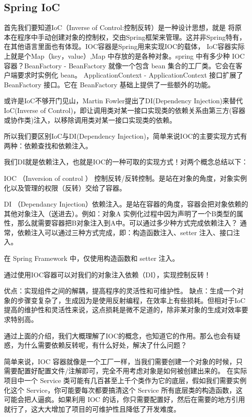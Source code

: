 \documentclass[../../../interview-questions.tex]{subfiles}
\begin{document}
\subsection{Spring IoC}

首先我们要知道IoC（Inverse of Control:控制反转）是一种设计思想，就是 将原本在程序中手动创建对象的控制权，交由Spring框架来管理。这并非Spring特有，在其他语言里面也有体现。IOC容器是Spring用来实现IOC的载体， IoC容器实际上就是个Map（key，value）,Map 中存放的是各种对象。spring 中有多少种 IOC 容器？BeanFactory - BeanFactory 就像一个包含 bean 集合的工厂类。它会在客户端要求时实例化 bean。
ApplicationContext - ApplicationContext 接口扩展了 BeanFactory 接口。它在 BeanFactory 基础上提供了一些额外的功能。

或许是IoC不够开门见山，Martin Fowler提出了DI(Dependency Injection)来替代IoC(Inverse of Control)，即让调用类对某一接口实现类的依赖关系由第三方(容器或协作类)注入，以移除调用类对某一接口实现类的依赖。

所以我们要区别IoC与DI(Dependency Injection)，简单来说IOC的主要实现方式有两种：依赖查找和依赖注入。

我们DI就是依赖注入，也就是IOC的一种可取的实现方式！对两个概念总结以下：

IOC （Inversion of control ） 控制反转/反转控制。是站在对象的角度，对象实例化以及管理的权限（反转）交给了容器。

DI （Dependancy Injection）依赖注入。是站在容器的角度，容器会把对象依赖的其他对象注入（送进去）。例如：对象A 实例化过程中因为声明了一个B类型的属性，那么就需要容器把B对象注入到A中。可以通过多少种方式完成依赖注入？
通常，依赖注入可以通过三种方式完成，即：构造函数注入、setter 注入、接口注入。

在 Spring Framework 中，仅使用构造函数和 setter 注入。

通过使用IOC容器可以对我们的对象注入依赖（DI），实现控制反转！

优点：实现组件之间的解耦，提高程序的灵活性和可维护性。
缺点：生成一个对象的步骤变复杂了，生成因为是使用反射编程，在效率上有些损耗。但相对于IoC提高的维护性和灵活性来说，这点损耗是微不足道的，除非某对象的生成对效率要求特别高。

通过上面的介绍，我们大概理解了IOC的概念，也知道它的作用。那么也会有疑惑，为什么需要依赖反转呢，有什么好处，解决了什么问题？

简单来说，IOC 容器就像是一个工厂一样，当我们需要创建一个对象的时候，只需要配置好配置文件/注解即可，完全不用考虑对象是如何被创建出来的。 在实际项目中一个 Service 类可能有几百甚至上千个类作为它的底层，假如我们需要实例化这个 Service，你可能要每次都要搞清这个 Service 所有底层类的构造函数，这可能会把人逼疯。如果利用 IOC 的话，你只需要配置好，然后在需要的地方引用就行了，这大大增加了项目的可维护性且降低了开发难度。
\end{document}
